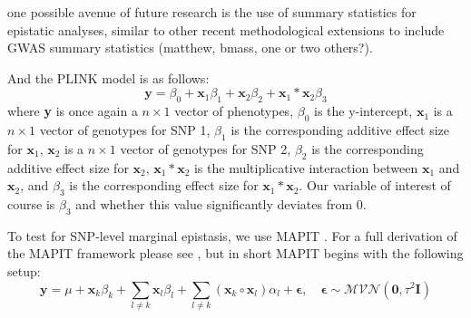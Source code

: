 \documentclass[12pt,a4paper]{article}
\begin{document}
one possible avenue of future research is the use of summary statistics for epistatic analyses, similar to other recent methodological extensions to include GWAS summary statistics (matthew, bmass, one or two others?).









And the PLINK model is as follows:
\begin{equation}
\textbf{y} = \beta_0 + \textbf{x}_1\beta_1 + \textbf{x}_2\beta_2 + \textbf{x}_1*\textbf{x}_2\beta_3    
\end{equation}
where \textbf{y} is once again a $n \times 1$ vector of phenotypes, $\beta_0$ is the y-intercept, $\textbf{x}_1$ is a $n \times 1$ vector of genotypes for SNP 1, $\beta_1$ is the corresponding additive effect size for $\textbf{x}_1$, $\textbf{x}_2$ is a $n \times 1$ vector of genotypes for SNP 2, $\beta_2$ is the corresponding additive effect size for $\textbf{x}_2$, $\textbf{x}_1 * \textbf{x}_2$ is the multiplicative interaction between $\textbf{x}_1$ and $\textbf{x}_2$, and $\beta_3$ is the corresponding effect size for $\textbf{x}_1 * \textbf{x}_2$. Our variable of interest of course is $\beta_3$ and whether this value significantly deviates from 0.


To test for SNP-level marginal epistasis, we use MAPIT \citep{Crawford2017a}. For a full derivation of the MAPIT framework please see \citet{Crawford2017a}, but in short MAPIT begins with the following setup:
\begin{equation}
\textbf{y} = \mu + \textbf{x}_k\beta_k + \sum_{l \neq k} \textbf{x}_l\beta_l + \sum_{l \neq k} (\textbf{x}_k \circ \textbf{x}_l)\alpha_l + \boldsymbol{\epsilon}, \quad \boldsymbol{\epsilon} \sim \mathcal{MVN}(\textbf{0}, \tau^{2}\textbf{I})  
\end{equation}
\end{document}
